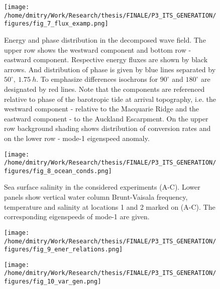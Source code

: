 \documentclass[12pt]{article}
\begin{document}
\begin{figure}
	\centering
	\texttt{[image: /home/dmitry/Work/Research/thesis/FINALE/P3\_ITS\_GENERATION/figures/fig\_7\_flux\_examp.png]}
	\caption{Energy and phase distribution in the decomposed wave field. The upper row shows the 
	westward component and bottom row - eastward component. Respective energy fluxes are shown by 
	black arrows. And distribution of phase is given by blue lines separated by 
	$50^{\circ},~1.75~h$. To emphasize differences isochrons for $90^{\circ}$ and $180^{\circ}$ are 
	designated by red lines. Note that the components are referenced relative to phase of the 
	barotropic tide at arrival topography, i.e. the westward component  - relative to the 
	Macquarie Ridge and the eastward component - to the Auckland Escarpment. On the upper row 
	background shading shows distribution of conversion rates and on the lower row - mode-1 
	eigenspeed anomaly.}
	\label{C3.fig:wv_fld_dist}
\end{figure}

\begin{figure}
	\centering
	\texttt{[image: /home/dmitry/Work/Research/thesis/FINALE/P3\_ITS\_GENERATION/figures/fig\_8\_ocean\_conds.png]}
	\caption{Sea surface salinity in the considered experiments (A-C). Lower panels show 
	vertical water column Brunt-Vaisala frequency, temperature and salinity at locations 1 and 2 
	marked on (A-C). The corresponding eigenspeeds of mode-1 are given.}
	\label{C3.fig:ocean_cond}
\end{figure}

\begin{figure}
	\centering
	\texttt{[image: /home/dmitry/Work/Research/thesis/FINALE/P3\_ITS\_GENERATION/figures/fig\_9\_ener\_relations.png]}
	\caption{}
	\label{C3.fig:ener_var}
\end{figure}

\begin{figure}
	\centering
	\texttt{[image: /home/dmitry/Work/Research/thesis/FINALE/P3\_ITS\_GENERATION/figures/fig\_10\_var\_gen.png]}
	\caption{}
	\label{C3.fig:var_sp}
\end{figure}
\end{document}
